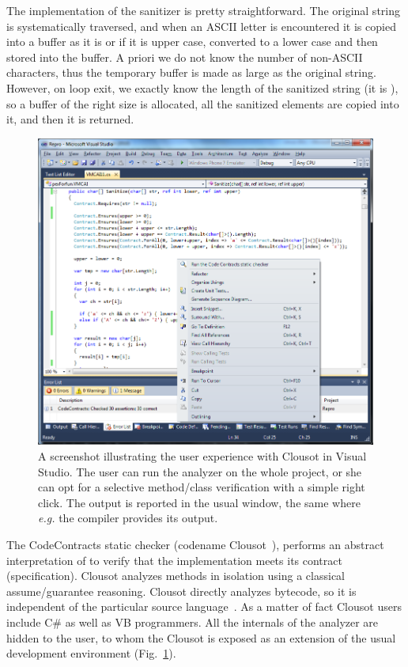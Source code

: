 \documentclass{llncs}
\begin{document}
The implementation of the sanitizer is pretty straightforward. 
The original string is systematically traversed, and when an ASCII letter is encountered  it is copied into a buffer as it is  or if it is upper case, converted to a lower case and then stored into the buffer. 
A priori we do not know the number of non-ASCII characters, thus the temporary buffer is made as large as the original string.
However, on loop exit, we exactly know the length of the sanitized string (it is ), so a buffer of the right size is allocated, all the sanitized elements are copied into it, and then it is returned.

\begin{figure}[t]
  \includegraphics[width=\textwidth]{screenshot.png}
\caption{A screenshot illustrating the user experience with Clousot in Visual Studio.
The user can run the analyzer on the whole project, or she can  opt for a selective method/class verification with a simple right click.
The output is reported in the usual  window, the same where \emph{e.g.} the compiler provides its output.
}
\label{fig:screenshot}
\end{figure}

The CodeContracts static checker (codename Clousot~\cite{MafLogozzo10}), performs an abstract interpretation of  to verify that the implementation meets its contract (specification).
Clousot analyzes methods in isolation using a classical assume/guarantee reasoning.
Clousot directly analyzes bytecode, so it is independent of the particular source language~\cite{LogozzoMaf08}. 
As a matter of fact Clousot users include C\# as well as VB programmers.
All the internals of the analyzer are hidden to the user, to whom the Clousot is exposed as an extension of the usual development environment (Fig.~\ref{fig:screenshot}).
\end{document}
